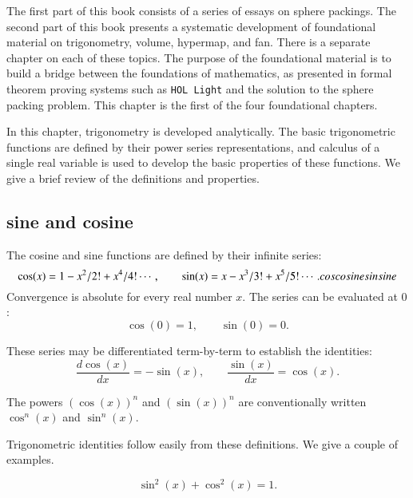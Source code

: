 
The first part of this book consists of a series of essays
on sphere packings.  The second part of this book presents
a systematic development of foundational material on
trigonometry, volume, hypermap, and fan.  There is a separate
chapter on each of these topics.  The purpose of the
foundational material is to build a bridge between
the foundations of mathematics, as presented in formal
theorem proving systems such as {\tt HOL Light} and the
solution to the sphere packing problem.  
This chapter is the first of the four foundational chapters.


In this chapter, trigonometry is developed analytically.  The basic
trigonometric functions are defined by their power series
representations, and calculus of a single real variable is used to
develop the basic properties of these functions.  We give a brief
review of the definitions and properties.


\subsection{sine and cosine}

The cosine and sine functions are defined by their infinite series:%
%
    \begin{equation}\label{eqn:cos-def}\cos(x) = 1 - x^2/2! + x^4/4! \cdots,\qquad
  \sin(x) = x - x^3/3! + x^5/5! \cdots.
    \index{Index}{cos}\index{Index}{cosine}\index{Index}{sin}\index{Index}{sine}
    \end{equation}
Convergence is absolute for every real number $x$.
The series can be evaluated at $0$:
    \begin{equation}\label{eqn:cos0}
    \cos(0) = 1,\qquad \sin(0) = 0.
    \end{equation}

These series may be differentiated term-by-term to establish the identities:
    \begin{equation}\label{eqn:cos'}
    \frac{d \cos(x)}{dx} = -\sin(x),\qquad \frac{ \sin(x)}{dx} = \cos(x).
    \end{equation}

The powers $(\cos(x))^n$ and $(\sin(x))^n$ are conventionally written
$\cos^n(x)$ and $\sin^n(x)$.

Trigonometric identities follow easily from these definitions.  We
give a couple of examples.

\begin{lemma}\label{lemma:circle} 
   $$\sin^2(x) + \cos^2(x) = 1.$$
\end{lemma}

